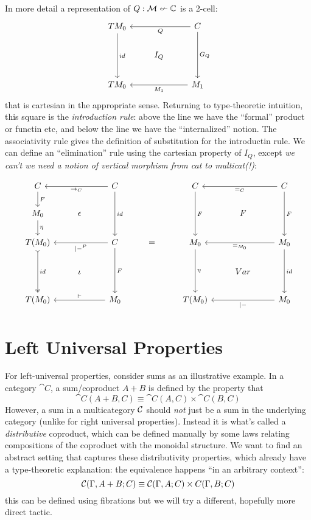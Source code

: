\documentclass{article}
\begin{document}
In more detail a representation of $Q : \mathcal M \nleftarrow \mathbb C$ is a
2-cell:
  \[
  \begin{tikzcd}
TM_0 \arrow[dd, "id"] &  & C \arrow[dd, "G_Q"] \arrow[ll, "Q"] \\
 & I_Q &  \\
TM_0 &  & M_1 \arrow[ll, "M_1"]
  \end{tikzcd}
  \]
that is cartesian in the appropriate sense.
%
Returning to type-theoretic intuition, this square is the
\emph{introduction rule}: above the line we have the ``formal''
product or functin etc, and below the line we have the
``internalized'' notion.
%
The associativity rule gives the definition of substitution for the
introductin rule.
%
We can define an ``elimination'' rule using the cartesian property of
$I_Q$, except \emph{we can't we need a notion of vertical morphism from cat to multicat(!)}:

\[\begin{tikzcd}
C \arrow[d, "F"] &  & C \arrow[ll, "\to_C"] \arrow[dd, "id"] &  & C \arrow[dd, "F"] &  & C \arrow[dd, "F"] \arrow[ll, "=_C"] \\
M_0 \arrow[d, "\eta"] & \epsilon &  &  &  & F &  \\
T(M_0) \arrow[dd, "id", two heads, tail] &  & C \arrow[ll, "|-^P"] \arrow[dd, "F"] & = & M_0 \arrow[dd, "\eta"] &  & M_0 \arrow[dd, "id"] \arrow[ll, "=_{M_0}"] \\
 & \iota &  &  &  & Var &  \\
T(M_0) &  & M_0 \arrow[ll, "\vdash"'] &  & T(M_0) &  & M_0 \arrow[ll, "|-"]
\end{tikzcd}
\]


\section{Left Universal Properties}

For left-universal properties, consider sums as an illustrative
example.
%
In a category $\cat C$, a sum/coproduct $A + B$ is defined by the property that
\[ \cat C(A + B, C) \equiv \cat C(A,C) \times \cat C(B,C) \]
%
However, a sum in a multicategory $\mathcal C$ should \emph{not} just be
a sum in the underlying category (unlike for right universal
properties).
%
Instead it is what's called a \emph{distributive} coproduct, which can
be defined manually by some laws relating compositions of the
coproduct with the monoidal structure.
%
We want to find an abstract setting that captures these distributivity
properties, which already have a type-theoretic explanation: the
equivalence happens ``in an arbitrary context'':
\[ \mathcal C(\Gamma,A + B; C) \equiv \mathcal C(\Gamma, A; C) \times C(\Gamma,B;C)\]
this can be defined using fibrations but we will try a different,
hopefully more direct tactic.
\end{document}
